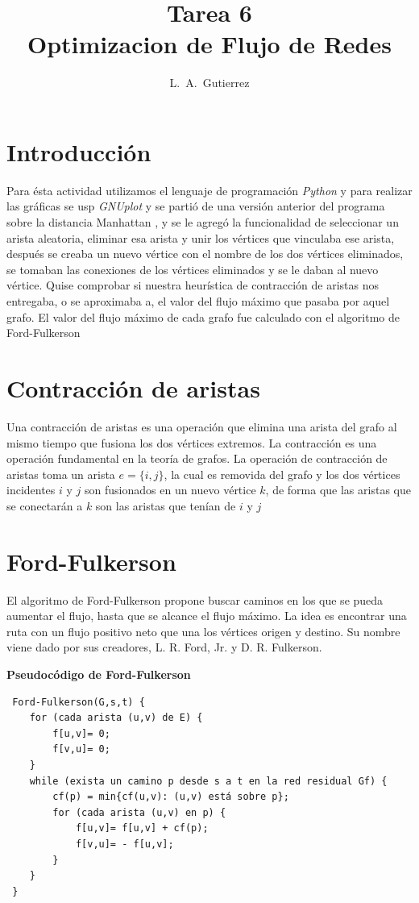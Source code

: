 \documentclass[12pt,letterpaper]{article}
\title{Tarea 6 \\ Optimizacion de Flujo de Redes}
\author{L.\ A.\ Gutierrez}
\begin{document}
\maketitle


\section*{Introducción}
Para ésta actividad utilizamos el lenguaje de programación \textit{Python} \cite{Python} y para realizar las gráficas se usp \textit{GNUplot} \cite{Gnuplot} y se partió de una versión anterior del programa sobre la distancia Manhattan \cite{Tarea5}, y se le agregó la funcionalidad de seleccionar un arista aleatoria, eliminar esa arista y unir los vértices que vinculaba ese arista, después se creaba un nuevo vértice con el nombre de los dos vértices eliminados, se tomaban las conexiones de los vértices eliminados y se le daban al nuevo vértice. Quise comprobar si nuestra heurística de contracción de aristas nos entregaba, o se aproximaba a, el valor del flujo máximo que pasaba por aquel grafo. El valor del flujo máximo de cada grafo fue calculado con el algoritmo de Ford-Fulkerson


\section*{Contracción de aristas}
Una contracción de aristas\cite{Contraccion} es una operación que elimina una arista del grafo al mismo tiempo que fusiona los dos vértices extremos. La contracción es una operación fundamental en la teoría de grafos.
La operación de contracción de aristas toma un arista $e = \lbrace {i,j} \rbrace$, la cual es removida del grafo y los dos vértices incidentes $i$ y $j$ son fusionados en un nuevo vértice $k$, de forma que las aristas que se conectarán a $k$ son las aristas que tenían de $i$ y $j$

\section*{Ford-Fulkerson}
El algoritmo de Ford-Fulkerson\cite{Ford-Fulkerson} propone buscar caminos en los que se pueda aumentar el flujo, hasta que se alcance el flujo máximo. La idea es encontrar una ruta con un flujo positivo neto que una los vértices origen y destino. Su nombre viene dado por sus creadores, L. R. Ford, Jr. y D. R. Fulkerson.

\newpage

\textbf{Pseudocódigo de Ford-Fulkerson}
\begin{verbatim}
 Ford-Fulkerson(G,s,t) { 
    for (cada arista (u,v) de E) { 
        f[u,v]= 0; 
        f[v,u]= 0; 
    } 
    while (exista un camino p desde s a t en la red residual Gf) { 
        cf(p) = min{cf(u,v): (u,v) está sobre p};
        for (cada arista (u,v) en p) { 
            f[u,v]= f[u,v] + cf(p); 
            f[v,u]= - f[u,v]; 
        }  
    } 
 }
\end{verbatim}
\end{document}
